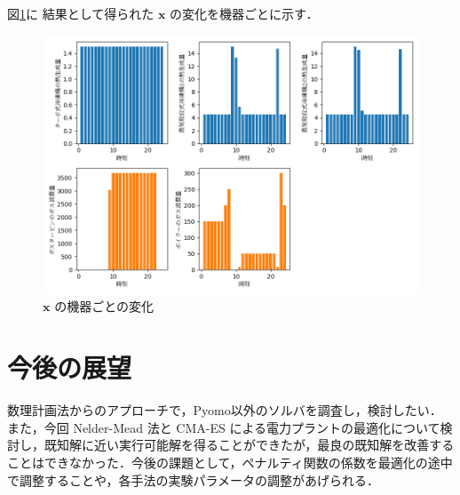\documentclass[twocolumn]{jarticle}
\begin{document}
図\ref{bar_graph}に 結果として得られた $\bm{x}$ の変化を機器ごとに示す．
\begin{figure}
    \centering
    \includegraphics[width=17cm]{bar_graph.png}
    \caption{$\bm{x}$ の機器ごとの変化}
    \label{bar_graph}
\end{figure}

\section{今後の展望}
数理計画法からのアプローチで，Pyomo以外のソルバを調査し，検討したい．
また，今回 Nelder-Mead 法と CMA-ES による電力プラントの最適化について検討し，既知解に近い実行可能解を得ることができたが，最良の既知解を改善することはできなかった．今後の課題として，ペナルティ関数の係数を最適化の途中で調整することや，各手法の実験パラメータの調整があげられる．


\end{document}
